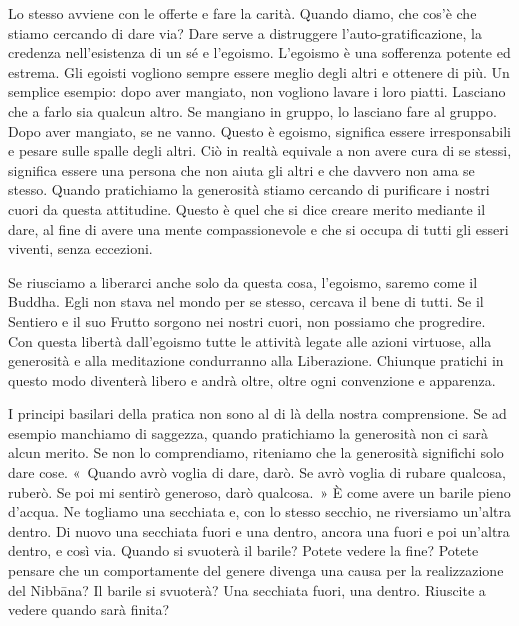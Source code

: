 Lo stesso avviene con le offerte e fare la carità. Quando diamo, che
cos'è che stiamo cercando di dare via? Dare serve a distruggere
l'auto-gratificazione, la credenza nell'esistenza di un sé e l'egoismo.
L'egoismo è una sofferenza potente ed estrema. Gli egoisti vogliono
sempre essere meglio degli altri e ottenere di più. Un semplice esempio:
dopo aver mangiato, non vogliono lavare i loro piatti. Lasciano che a
farlo sia qualcun altro. Se mangiano in gruppo, lo lasciano fare al
gruppo. Dopo aver mangiato, se ne vanno. Questo è egoismo, significa
essere irresponsabili e pesare sulle spalle degli altri. Ciò in realtà
equivale a non avere cura di se stessi, significa essere una persona che
non aiuta gli altri e che davvero non ama se stesso. Quando pratichiamo
la generosità stiamo cercando di purificare i nostri cuori da questa
attitudine. Questo è quel che si dice creare merito mediante il dare, al
fine di avere una mente compassionevole e che si occupa di tutti gli
esseri viventi, senza eccezioni.

Se riusciamo a liberarci anche solo da questa cosa, l'egoismo, saremo
come il Buddha. Egli non stava nel mondo per se stesso, cercava il bene
di tutti. Se il Sentiero e il suo Frutto sorgono nei nostri cuori, non
possiamo che progredire. Con questa libertà dall'egoismo tutte le
attività legate alle azioni virtuose, alla generosità e alla meditazione
condurranno alla Liberazione. Chiunque pratichi in questo modo diventerà
libero e andrà oltre, oltre ogni convenzione e apparenza.

I principi basilari della pratica non sono al di là della nostra
comprensione. Se ad esempio manchiamo di saggezza, quando pratichiamo la
generosità non ci sarà alcun merito. Se non lo comprendiamo, riteniamo
che la generosità significhi solo dare cose. «~Quando avrò voglia di
dare, darò. Se avrò voglia di rubare qualcosa, ruberò. Se poi mi sentirò
generoso, darò qualcosa.~» È come avere un barile pieno d'acqua. Ne
togliamo una secchiata e, con lo stesso secchio, ne riversiamo un'altra
dentro. Di nuovo una secchiata fuori e una dentro, ancora una fuori e
poi un'altra dentro, e così via. Quando si svuoterà il barile? Potete
vedere la fine? Potete pensare che un comportamente del genere divenga
una causa per la realizzazione del Nibbāna? Il barile si
svuoterà? Una secchiata fuori, una dentro. Riuscite a vedere quando sarà
finita?

